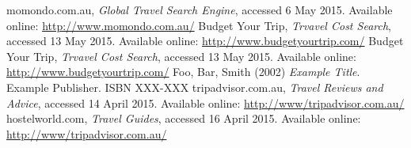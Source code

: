 \documentclass[12pt]{article}
\begin{document}

\begin{thebibliography}{99}
momondo.com.au,
\emph{Global Travel Search Engine}, accessed 6 May 2015.
Available online: \url{http://www.momondo.com.au/}
Budget Your Trip,
\emph{Trvavel Cost Search}, accessed 13 May 2015.
Available online: \url{http://www.budgetyourtrip.com/}
Budget Your Trip,
\emph{Trvavel Cost Search}, accessed 13 May 2015.
Available online: \url{http://www.budgetyourtrip.com/}
Foo, Bar, Smith (2002)
\emph{Example Title}.
Example Publisher. ISBN XXX-XXX
tripadvisor.com.au,
\emph{Travel Reviews and Advice}, accessed 14 April 2015.
Available online: \url{http://www/tripadvisor.com.au/}
hostelworld.com,
\emph{Travel Guides}, accessed 16 April 2015.
Available online: \url{http://www/tripadvisor.com.au/}
\end{thebibliography}




\end{document}
